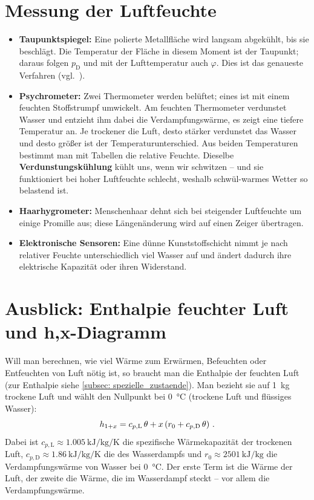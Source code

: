 \section{Messung der Luftfeuchte}\label{sec: feuchtemessung}
\begin{itemize}
    \item \textbf{Taupunktspiegel:} Eine polierte Metallfläche wird langsam abgekühlt, bis sie beschlägt. Die Temperatur der Fläche in diesem Moment ist der Taupunkt; daraus folgen $p_\text{D}$ und mit der Lufttemperatur auch $\varphi$. Dies ist das genaueste Verfahren (vgl.~\cite[S.~639]{Giancoli2010}).
    \item \textbf{Psychrometer:} Zwei Thermometer werden belüftet; eines ist mit einem feuchten Stoffstrumpf umwickelt. Am feuchten Thermometer verdunstet Wasser und entzieht ihm dabei die Verdampfungswärme, es zeigt eine tiefere Temperatur an. Je trockener die Luft, desto stärker verdunstet das Wasser und desto größer ist der Temperaturunterschied. Aus beiden Temperaturen bestimmt man mit Tabellen die relative Feuchte. Dieselbe \textbf{Verdunstungskühlung} kühlt uns, wenn wir schwitzen -- und sie funktioniert bei hoher Luftfeuchte schlecht, weshalb schwül-warmes Wetter so belastend ist.
    \item \textbf{Haarhygrometer:} Menschenhaar dehnt sich bei steigender Luftfeuchte um einige Promille aus; diese Längenänderung wird auf einen Zeiger übertragen.
    \item \textbf{Elektronische Sensoren:} Eine dünne Kunststoffschicht nimmt je nach relativer Feuchte unterschiedlich viel Wasser auf und ändert dadurch ihre elektrische Kapazität oder ihren Widerstand.
\end{itemize}

\section{Ausblick: Enthalpie feuchter Luft und h,x-Diagramm}\label{sec: hx_diagramm}
Will man berechnen, wie viel Wärme zum Erwärmen, Befeuchten oder Entfeuchten von Luft nötig ist, so braucht man die Enthalpie der feuchten Luft (zur Enthalpie siehe \cref{subsec: spezielle_zustaende}). Man bezieht sie auf \SI{1}{\kilogram} trockene Luft und wählt den Nullpunkt bei \SI{0}{\celsius} (trockene Luft und flüssiges Wasser):
\begin{equation}\label{eq: enthalpie_feuchte_luft}
    h_{1+x} = c_{p,\text{L}}\, \theta + x \left( r_0 + c_{p,\text{D}}\, \theta \right) \,.
\end{equation}
Dabei ist $c_{p,\text{L}} \approx \SI{1.005}{\kilo\joule\per\kilogram\per\kelvin}$ die spezifische Wärmekapazität der trockenen Luft, $c_{p,\text{D}} \approx \SI{1.86}{\kilo\joule\per\kilogram\per\kelvin}$ die des Wasserdampfs und $r_0 \approx \SI{2501}{\kilo\joule\per\kilogram}$ die Verdampfungswärme von Wasser bei \SI{0}{\celsius}. Der erste Term ist die  Wärme der Luft, der zweite die Wärme, die im Wasserdampf steckt -- vor allem die  Verdampfungswärme.


